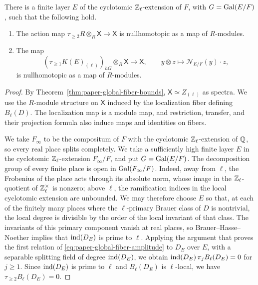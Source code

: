 \begin{lemma}\label{lem:paper-gem-positive-action}
There is a finite layer $E$ of the cyclotomic $\mathbb Z_\ell$-extension of $F$, with $G=\operatorname{Gal}(E/F)$, such that the following hold.
\begin{enumerate}
\item The action map $\tau_{\ge2}R\otimes_R\mathsf{X}\to\mathsf{X}$ is nullhomotopic as a map of $R$-modules.
\item The map
\[
 (\tau_{\ge1}K(E)_{(\ell)})_{hG}\otimes_R\mathsf{X}\longrightarrow\mathsf{X},
 \qquad y\otimes z\longmapsto\mathcal N_{E/F}(y)\cdot z,
\]
is nullhomotopic as a map of $R$-modules.
\end{enumerate}
\end{lemma}
\begin{proof}
By Theorem~\ref{thm:paper-global-fiber-bounds}, $\mathsf X\simeq Z_{(\ell)}$ as spectra.
We use the $R$-module structure on $\mathsf X$ induced by the localization fiber defining $B_\ell(D)$.
The localization map is a module map, and restriction, transfer, and their projection formula also induce maps and identities on fibers.

We take $F_\infty$ to be the compositum of $F$ with the cyclotomic $\mathbb Z_\ell$-extension of $\mathbb Q$, so every real place splits completely.
We take a sufficiently high finite layer $E$ in the cyclotomic $\mathbb Z_\ell$-extension $F_\infty/F$, and put $G=\operatorname{Gal}(E/F)$.
The decomposition group of every finite place is open in $\operatorname{Gal}(F_\infty/F)$.
Indeed, away from $\ell$, the Frobenius of the place acts through its absolute norm, whose image in the $\mathbb Z_\ell$-quotient of $\mathbb Z_\ell^\times$ is nonzero; above $\ell$, the ramification indices in the local cyclotomic extension are unbounded.
We may therefore choose $E$ so that, at each of the finitely many places where the $\ell$-primary Brauer class of $D$ is nontrivial, the local degree is divisible by the order of the local invariant of that class.
The invariants of this primary component vanish at real places, so Brauer--Hasse--Noether implies that $\operatorname{ind}(D_E)$ is prime to $\ell$.
Applying the argument that proves the first relation of \eqref{eq:paper-global-fiber-amplitude} to $D_E$ over $E$, with a separable splitting field of degree $\operatorname{ind}(D_E)$, we obtain $\operatorname{ind}(D_E)\,\pi_jB_\ell(D_E)=0$ for $j\ge1$.
Since $\operatorname{ind}(D_E)$ is prime to $\ell$ and $B_\ell(D_E)$ is $\ell$-local, we have $\tau_{\ge2}B_\ell(D_E)=0$.


\end{proof}
